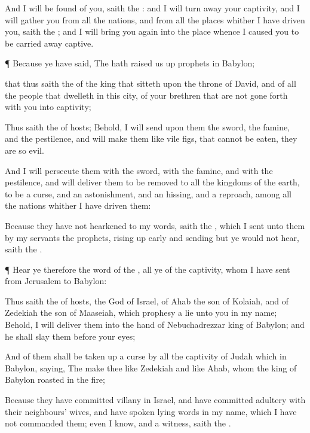 {And I will be
found of you,
saith the
{}: and I will turn
away your
captivity, and I will
gather you from all the
nations, and from all the
places whither I have
driven you,
saith the
{}; and I will bring you
again into the
place whence I caused you to be carried away
captive.


\par }{\PP {}¶ Because ye have
said, The
{} hath raised us
up
prophets in
Babylon;

 that thus
saith the
{} of the
king that
sitteth upon the
throne of
David, and of all the
people that
dwelleth in this
city,
{} of your
brethren that are not gone
forth with you into
captivity;

Thus
saith the
{} of
hosts; Behold, I will
send upon them the
sword, the
famine, and the
pestilence, and will
make them like
vile
figs, that cannot be
eaten, they are so
evil.

And I will
persecute
them with the
sword, with the
famine, and with the
pestilence, and will
deliver them to be
removed to all the
kingdoms of the
earth, to be a
curse, and an
astonishment, and an
hissing, and a
reproach, among all the
nations whither I have
driven them:

Because they have not
hearkened to my
words,
saith the
{}, which I
sent unto them by my
servants the
prophets, rising up
early and
sending
{} but ye would not
hear,
saith the
{}.


\par }{\PP {}¶
Hear ye therefore the
word of the
{}, all ye of the
captivity, whom I have
sent from
Jerusalem to
Babylon:

Thus
saith the
{} of
hosts, the
God of
Israel, of
Ahab the
son of
Kolaiah, and of
Zedekiah the
son of
Maaseiah, which
prophesy a
lie unto you in my
name; Behold, I will
deliver them into the
hand of
Nebuchadrezzar
king of
Babylon; and he shall
slay them before your
eyes;

And of them shall be taken
up a
curse by all the
captivity of
Judah which
{} in
Babylon,
saying, The
{}
make thee like
Zedekiah and like
Ahab, whom the
king of
Babylon
roasted in the
fire;

Because they have
committed
villany in
Israel, and have
committed
adultery with their
neighbours’
wives, and have
spoken
lying
words in my
name, which I have not
commanded them; even I
know, and
{} a
witness,
saith the
{}.


}
